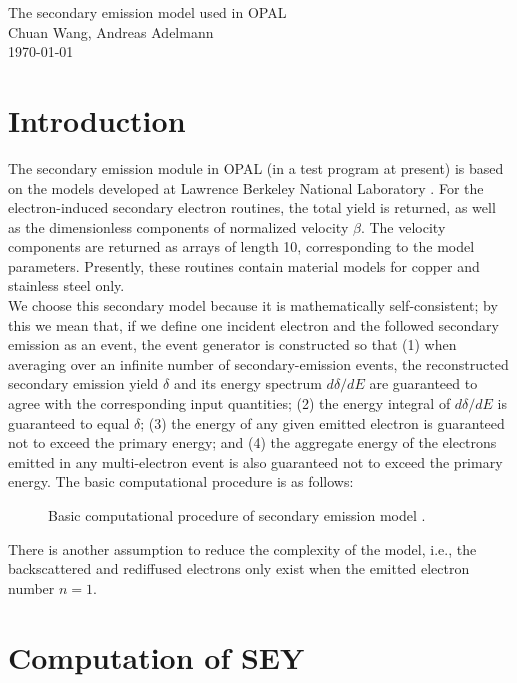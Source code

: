 \documentclass[a4paper,11pt]{article}
\begin{document}
\begin{center}
{\large The secondary emission model used in OPAL} \\
Chuan Wang, Andreas Adelmann \\
\today\\
\end{center}
\section{Introduction}
The secondary emission module in OPAL (in a test program at present) is based on the models developed at Lawrence Berkeley National Laboratory \cite{SE}.  For the electron-induced secondary electron routines, the total yield is returned, as well as the dimensionless components of normalized velocity $\beta$. The velocity components are returned as arrays of length 10, corresponding to the model parameters. Presently, these routines contain material models for copper and stainless steel only.\\

We choose this secondary model because it is mathematically self-consistent; by this we mean that, if we define one incident electron and the followed secondary emission as an event, the event generator is constructed so that (1) when averaging over an infinite number of secondary-emission events, the reconstructed secondary emission yield $\delta$ and its energy spectrum $ d\delta/dE$ are guaranteed to agree with  the corresponding input quantities; (2) the energy integral of $ d\delta/dE$ is guaranteed to equal $\delta$; (3) the energy of any given emitted electron is guaranteed not to exceed the primary energy; and (4) the aggregate energy of the electrons emitted in any multi-electron event is also guaranteed not to exceed the primary energy. The basic computational procedure is as follows:\\
\begin{figure}[H]
\begin{center}

\end{center}
\caption{  Basic computational procedure of secondary emission model .\label{fig:P-B}}
\end{figure}
There is another assumption to reduce the complexity of the model, i.e., the backscattered and rediffused electrons only exist when the emitted electron number $n = 1$.

\section{Computation of SEY}
\end{document}
